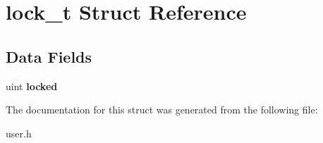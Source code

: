 \hypertarget{structlock__t}{}\section{lock\+\_\+t Struct Reference}
\label{structlock__t}
\subsection*{Data Fields}
\begin{DoxyCompactItemize}
\item 
\mbox{\label{structlock__t_aabb79a73ec1857343f98026d1e2f0ad8}} 
uint {\bfseries locked}
\end{DoxyCompactItemize}


The documentation for this struct was generated from the following file\+:\begin{DoxyCompactItemize}
\item 
user.\+h\end{DoxyCompactItemize}
